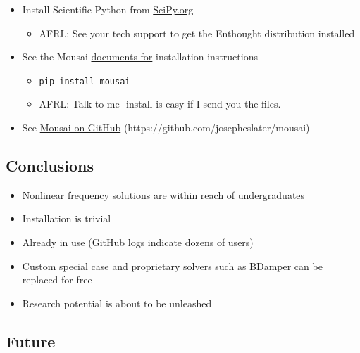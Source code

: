\documentclass[11pt]{article}
\providecommand{\tightlist}{%
      \setlength{\itemsep}{0pt}\setlength{\parskip}{0pt}}
\begin{document}
\begin{itemize}
\tightlist
\item
  Install Scientific Python from
  \href{https://www.scipy.org/install.html}{SciPy.org}

  \begin{itemize}
  \tightlist
  \item
    AFRL: See your tech support to get the Enthought distribution
    installed
  \end{itemize}
\item
  See the Mousai
  \href{https://josephcslater.github.io/mousai/index.html}{documents
  for} installation instructions

  \begin{itemize}
  \tightlist
  \item
    \texttt{pip\ install\ mousai}
  \item
    AFRL: Talk to me- install is easy if I send you the files.
  \end{itemize}
\item
  See \href{https://github.com/josephcslater/mousai}{Mousai on GitHub}
  (https://github.com/josephcslater/mousai)
\end{itemize}

    \subsection{Conclusions}\label{conclusions}

\begin{itemize}
\tightlist
\item
  Nonlinear frequency solutions are within reach of undergraduates
\item
  Installation is trivial
\item
  Already in use (GitHub logs indicate dozens of users)
\item
  Custom special case and proprietary solvers such as BDamper can be
  replaced for free
\item
  Research potential is about to be unleashed
\end{itemize}

    \subsection{Future}\label{future}
\end{document}
